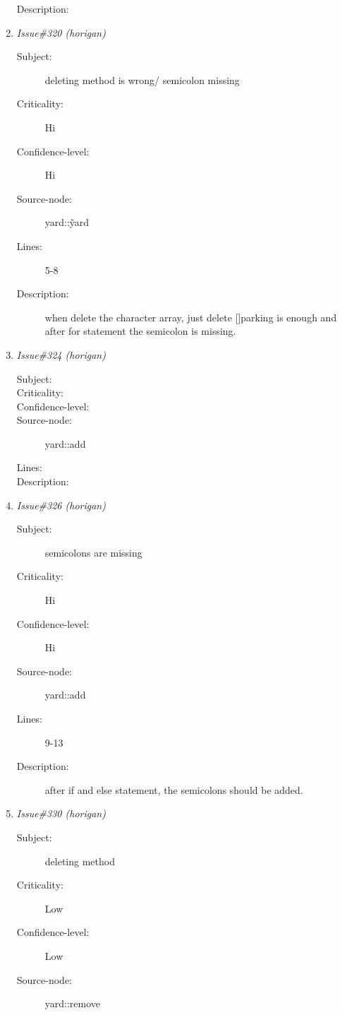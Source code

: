 \begin{enumerate}
\begin{description}
\item [Description:] 
\end{description}
\item {\it Issue\#320 (horigan)}
\begin{description}
\item [Subject:] deleting method is wrong/ semicolon missing
\item [Criticality:] Hi
\item [Confidence-level:] Hi
\item [Source-node:] yard::\~yard

\item [Lines:] 5-8

\item [Description:] when delete the character array, just
delete []parking is enough and after for statement the semicolon is missing.
\end{description}
\item {\it Issue\#324 (horigan)}
\begin{description}
\item [Subject:] 
\item [Criticality:] 
\item [Confidence-level:] 
\item [Source-node:] yard::add

\item [Lines:] 

\item [Description:] 
\end{description}
\item {\it Issue\#326 (horigan)}
\begin{description}
\item [Subject:] semicolons are missing
\item [Criticality:] Hi
\item [Confidence-level:] Hi
\item [Source-node:] yard::add

\item [Lines:] 9-13

\item [Description:] after if and else statement, the semicolons
should be added.
\end{description}
\item {\it Issue\#330 (horigan)}
\begin{description}
\item [Subject:] deleting method
\item [Criticality:] Low
\item [Confidence-level:] Low
\item [Source-node:] yard::remove


\end{description}
\end{enumerate}
